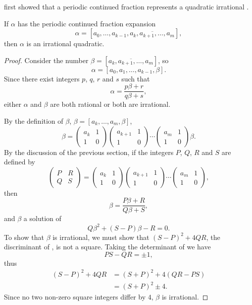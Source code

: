 {\Euler} first showed that a periodic continued fraction represents a
quadratic irrational \cite{Euler:CF}.

\begin{proposition}[Euler] \label{Euler:Periodic:Quad:Prop}
If $\alpha$ has the periodic continued fraction expansion
\[
\alpha = [a_0, \ldots, a_{k-1}, \overline{a_k, a_{k+1}, \ldots, a_m}],
\]
then $\alpha$ is an irrational quadratic.
\end{proposition}

\begin{proof}
Consider the number $\beta = [\overline{a_k, a_{k+1}, \ldots, a_m}]$,
so 
\[
\alpha = [a_0, a_1, \ldots, a_{k-1}, \beta].
\]
Since there exist integers $p$, $q$, $r$ and $s$ such that
\[
\alpha = \frac{p\beta + r}{q\beta + s},
\]
either $\alpha$ and $\beta$ are both rational or both are irrational.

By the definition of $\beta$, $\beta = [a_k, \ldots, a_m, \beta]$, \ie
\[
\beta = 
  \left(\begin{array}{cc}a_k& 1\\ 1 & 0\end{array}\right) 
\left(\begin{array}{cc}a_{k+1}& 1\\ 1 & 0\end{array}\right) 
  \cdots
\left(\begin{array}{cc}a_m& 1\\ 1 & 0\end{array}\right) \beta.
\]
By the discussion of the previous section, if the integers $P$, $Q$,
$R$ and $S$ are defined by
\begin{equation}\label{CF:Periodic:1:Eq}
\left(\begin{array}{cc}P& R\\ Q & S\end{array}\right) = 
\left(\begin{array}{cc}a_k& 1\\ 1 & 0\end{array}\right) 
\left(\begin{array}{cc}a_{k+1}& 1\\ 1 & 0\end{array}\right) 
  \cdots
\left(\begin{array}{cc}a_m& 1\\ 1 & 0\end{array}\right),
\end{equation}
then 
\[
\beta = \frac{P\beta + R}{Q \beta + S},
\]
and $\beta$ a solution of 
\begin{equation}\label{CF:Periodic:2:Eq}
Q\beta^2 + (S - P) \beta - R = 0.
\end{equation}
To show that $\beta$ is irrational, we must show that $(S - P)^2 +
4QR$, the discriminant of , is not a square.
Taking the determinant of  we have
\[
PS - QR = \pm 1,
\]
thus
\[
\begin {aligned}
  (S-P)^2 + 4QR & = (S+P)^2 + 4 (QR - PS) \\
   & = (S+P)^2 \pm 4.
\end{aligned}
\]
Since no two non-zero square integers differ by $4$, $\beta$ is irrational.
\end{proof}

